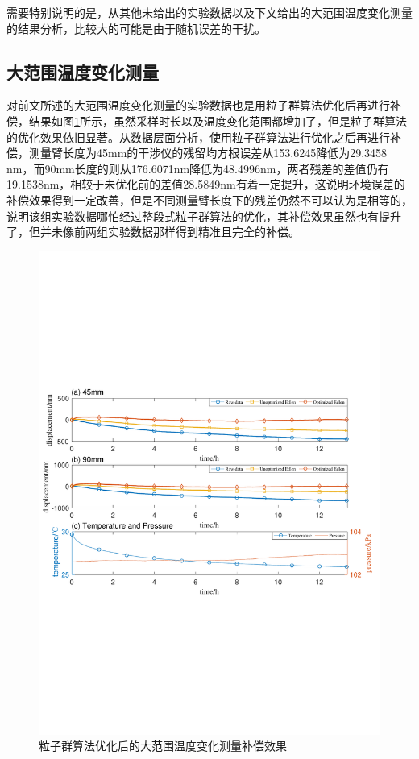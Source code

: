 需要特别说明的是，从其他未给出的实验数据以及下文给出的大范围温度变化测量的结果分析，比较大的可能是由于随机误差的干扰。
\subsection{大范围温度变化测量}
对前文所述的大范围温度变化测量的实验数据也是用粒子群算法优化后再进行补偿，结果如图\ref{fig:粒子群算法优化后的大范围温度变化测量补偿效果}所示，虽然采样时长以及温度变化范围都增加了，但是粒子群算法的优化效果依旧显著。从数据层面分析，使用粒子群算法进行优化之后再进行补偿，测量臂长度为45mm的干涉仪的残留均方根误差从153.6245降低为29.3458 nm，而90mm长度的则从176.6071nm降低为48.4996nm，两者残差的差值仍有19.1538nm，相较于未优化前的差值28.5849nm有着一定提升，这说明环境误差的补偿效果得到一定改善，但是不同测量臂长度下的残差仍然不可以认为是相等的，说明该组实验数据哪怕经过整段式粒子群算法的优化，其补偿效果虽然也有提升了，但并未像前两组实验数据那样得到精准且完全的补偿。
\begin{figure}[htb]
  \centering
  \includegraphics[width=14cm]{fig/4-fig/edpso_大范围温度变化测量数据.pdf}
  \caption{粒子群算法优化后的大范围温度变化测量补偿效果}
  \label{fig:粒子群算法优化后的大范围温度变化测量补偿效果}
\end{figure}

